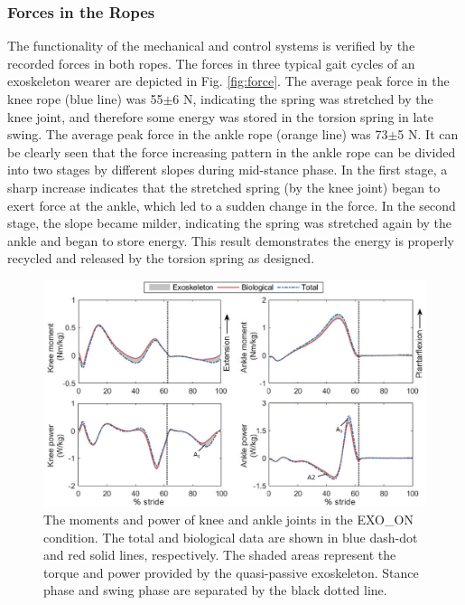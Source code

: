 \documentclass[twocolumn,cleanfoot,10pt]{asme2ej}
\begin{document}
\subsubsection{Forces in the Ropes}
The functionality of the mechanical and control systems is verified by the recorded forces in both ropes.
The forces in three typical gait cycles of an exoskeleton wearer are depicted in Fig. \ref{fig:force}.
The average peak force in the knee rope (blue line) was 55$\pm$6 N, indicating the spring was stretched by the knee joint, and therefore some energy was stored in the torsion spring in late swing.
The average peak force in the ankle rope (orange line) was 73$\pm$5 N.
It can be clearly seen that the force increasing pattern in the ankle rope can be divided into two stages by different slopes during mid-stance phase.
In the first stage, a sharp increase indicates that the stretched spring (by the knee joint) began to exert force at the ankle, which led to a sudden change in the force.
In the second stage, the slope became milder, indicating the spring was stretched again by the ankle and began to store energy.
This result demonstrates the energy is properly recycled and released by the torsion spring as designed.

\begin{figure}[t]
	\centering
	\includegraphics[width=17cm]{exo.eps}
	\caption{The moments and power of knee and ankle joints in the EXO\_ON condition.
	The total and biological data are shown in blue dash-dot and red solid lines, respectively.
	The shaded areas represent the torque and power provided by the quasi-passive exoskeleton.
	Stance phase and swing phase are separated by the black dotted line.}
	\label{fig:exo}
\end{figure}
\end{document}
